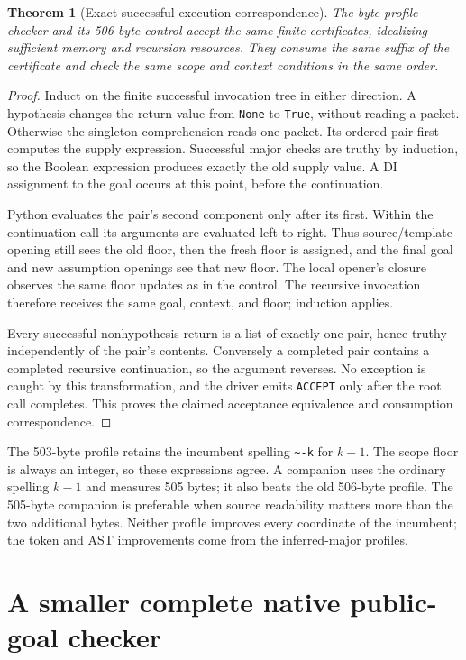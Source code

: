 \documentclass[11pt,letterpaper]{article}
\newtheorem{theorem}{Theorem}[section]
\theoremstyle{definition}
\begin{document}
\begin{theorem}[Exact successful-execution correspondence]
The byte-profile checker and its 506-byte control accept the same finite
certificates, idealizing sufficient memory and recursion resources. They
consume the same suffix of the certificate and check the same scope and
context conditions in the same order.
\end{theorem}
\begin{proof}
Induct on the finite successful invocation tree in either direction.
A hypothesis changes the return value from \texttt{None} to
\texttt{True}, without reading a packet. Otherwise the singleton
comprehension reads one packet. Its ordered pair first computes the supply
expression. Successful major checks are truthy by induction, so the
Boolean expression produces exactly the old supply value. A DI assignment
to the goal occurs at this point, before the continuation.

Python evaluates the pair's second component only after its first.
Within the continuation call its arguments are evaluated left to right.
Thus source/template opening still sees the old floor, then the fresh
floor is assigned, and the final goal and new assumption openings see
that new floor. The local opener's closure observes the same floor
updates as in the control. The recursive invocation therefore receives
the same goal, context, and floor; induction applies.

Every successful nonhypothesis return is a list of exactly one pair, hence
truthy independently of the pair's contents. Conversely a completed pair
contains a completed recursive continuation, so the argument reverses.
No exception is caught by this transformation, and the driver emits
\texttt{ACCEPT} only after the root call completes. This proves the
claimed acceptance equivalence and consumption correspondence.
\end{proof}

The 503-byte profile retains the incumbent spelling \texttt{\~{}-k} for
$k-1$. The scope floor is always an integer, so these expressions agree.
A companion uses the ordinary spelling $k-1$ and measures 505 bytes;
it also beats the old 506-byte profile. The 505-byte companion is preferable
when source readability matters more than the two additional bytes.
Neither profile improves every coordinate of the incumbent; the token
and AST improvements come from the inferred-major profiles.

\section{A smaller complete native public-goal checker}
\label{sec:native-proof}
\end{document}
